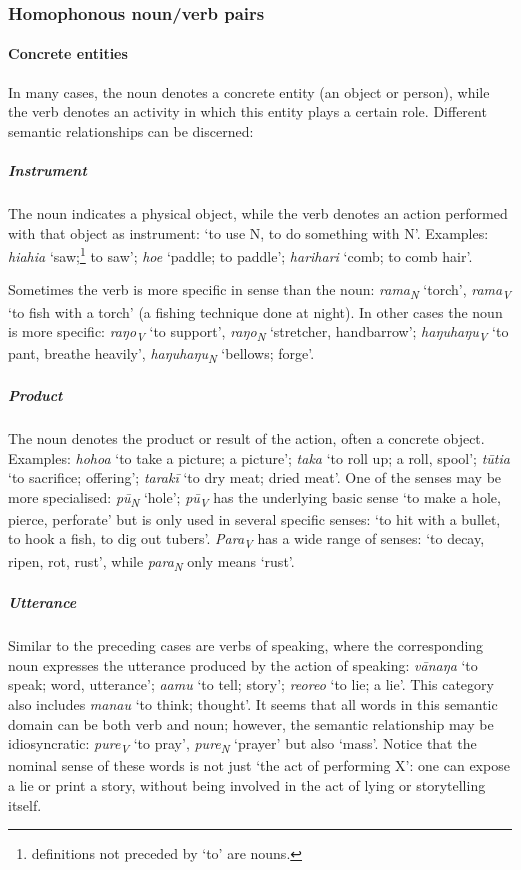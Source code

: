 \subsubsection[Homophonous noun/verb pairs]{Homophonous noun/verb pairs}\label{sec:3.2.2.1}

\paragraph{Concrete entities}\label{sec:3.2.2.1.1} In many cases, the noun denotes a concrete entity (an object or person), while the verb denotes an activity in which this entity plays a certain role. Different semantic relationships can be discerned:

\subparagraph{Instrument} The noun indicates a physical object, while the verb denotes an action performed with that object as instrument: ‘to use N, to do something with N’. Examples: \textit{hiahia} ‘saw;\footnote{\label{fn:100} definitions not preceded by ‘to’ are nouns.} to saw’; \textit{hoe} ‘paddle; to paddle’; \textit{harihari} ‘comb; to comb hair’. 

Sometimes the verb is more specific in sense than the noun: \textit{rama}\textit{\textsubscript{N}} ‘torch’, \textit{rama}\textit{\textsubscript{V}} ‘to fish with a torch’ (a fishing technique done at night). In other cases the noun is more specific: \textit{raŋo}\textit{\textsubscript{V}} ‘to support’, \textit{raŋo}\textit{\textsubscript{N}} ‘stretcher, handbarrow’; \textit{haŋuhaŋu}\textit{\textsubscript{V}} ‘to pant, breathe heavily’, \textit{haŋuhaŋu}\textit{\textsubscript{N}} ‘bellows; forge’. 

\subparagraph{Product} The noun denotes the product or result of the action, often a concrete object. Examples: \textit{hoho{\ꞌ}a}\textit{\textsubscript{}} ‘to take a picture; a picture’; \textit{taka} ‘to roll up; a roll, spool’; \textit{tūtia} ‘to sacrifice; offering’; \textit{tarakī} ‘to dry meat; dried meat’. One of the senses may be more specialised: \textit{pū}\textit{\textsubscript{N}} ‘hole’; \textit{pū}\textit{\textsubscript{V}} has the underlying basic sense ‘to make a hole, pierce, perforate’ but is only used in several specific senses: ‘to hit with a bullet, to hook a fish, to dig out tubers’. \textit{Para}\textit{\textsubscript{V}} has a wide range of senses: ‘to decay, ripen, rot, rust’, while \textit{para}\textit{\textsubscript{N}} only means ‘rust’.

\subparagraph{Utterance} Similar to the preceding cases are verbs of speaking, where the corresponding noun expresses the utterance produced by the action of speaking: \textit{vānaŋa} ‘to speak; word, utterance’; \textit{\mbox{{\ꞌ}a{\ꞌ}amu}} ‘to tell; story’; \textit{reoreo} ‘to lie; a lie’. This category also includes \textit{mana{\ꞌ}u} ‘to think; thought’. It seems that all words in this semantic domain can be both verb and noun; however, the semantic relationship may be idiosyncratic: \textit{pure}\textit{\textsubscript{V}} ‘to pray’, \textit{pure}\textit{\textsubscript{N}} ‘prayer’ but also ‘mass’. Notice that the nominal sense of these words is not just ‘the act of performing X’: one can expose a lie or print a story, without being involved in the act of lying or storytelling itself. 

